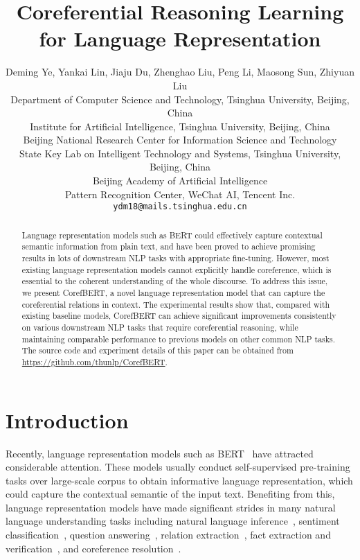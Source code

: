 \documentclass[11pt,a4paper]{article}
\title{Coreferential Reasoning Learning for Language Representation}
\author{Deming Ye, Yankai Lin, Jiaju Du, Zhenghao Liu,  Peng Li, Maosong Sun, Zhiyuan Liu\\
Department of Computer Science and Technology, Tsinghua University, Beijing, China\\
Institute for Artificial Intelligence, Tsinghua University, Beijing, China\\
Beijing National Research Center for Information Science and Technology\\
State Key Lab on Intelligent Technology and Systems, Tsinghua University, Beijing, China\\
Beijing Academy of Artificial Intelligence \\
Pattern Recognition Center, WeChat AI, Tencent Inc.\\
\texttt{ydm18@mails.tsinghua.edu.cn}
}
\date{}
\begin{document}
\maketitle
\begin{abstract}

Language representation models such as BERT could effectively capture contextual semantic information from plain text, and have been proved to achieve promising results in lots of downstream NLP tasks with appropriate fine-tuning. 
However, most existing language representation models cannot explicitly handle coreference, which is essential to the coherent understanding of the whole discourse.
To address this issue, we present CorefBERT, a novel language representation model that can capture the coreferential relations in context.
The experimental results show that, compared with existing baseline models,  CorefBERT can achieve significant improvements consistently on various downstream NLP tasks that require coreferential reasoning, while maintaining comparable performance to previous models on other common NLP tasks. The source code and experiment details of this paper can be obtained from \url{https://github.com/thunlp/CorefBERT}.


\end{abstract}




\section{Introduction}




Recently, language representation models such as BERT~\citep{BERT} have attracted considerable attention. These models usually conduct self-supervised pre-training tasks over large-scale corpus to obtain informative language representation, which could capture the contextual semantic of the input text. 
Benefiting from this, language representation models have made significant strides in many natural language understanding tasks including natural language inference~\citep{nlibert},  sentiment classification~\citep{sentimentbert}, question answering~\citep{qabert}, relation extraction~\citep{peters-etal-2019-knowledge}, fact extraction and verification~\citep{Zhoujie}, and coreference resolution~\citep{bertforcoref}.
\end{document}
